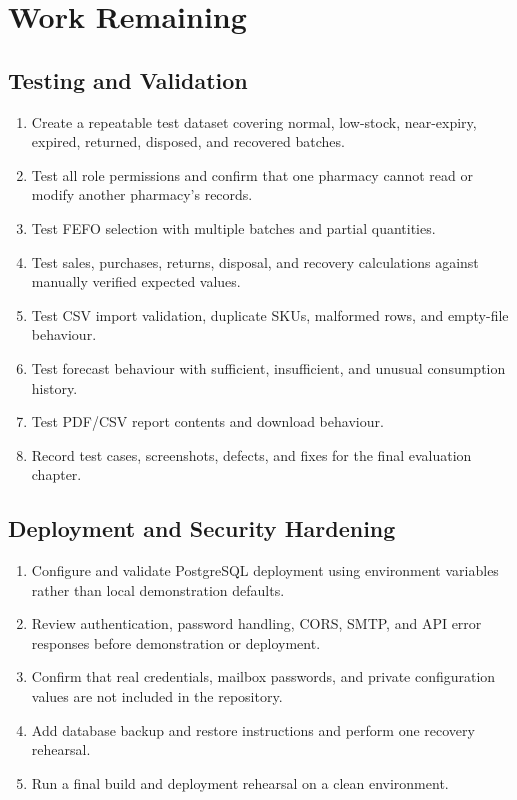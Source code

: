 \documentclass[12pt,a4paper]{article}
\begin{document}
\section{Work Remaining}
\subsection{Testing and Validation}
\begin{enumerate}[leftmargin=*]
    \item Create a repeatable test dataset covering normal, low-stock,
    near-expiry, expired, returned, disposed, and recovered batches.
    \item Test all role permissions and confirm that one pharmacy cannot read or
    modify another pharmacy's records.
    \item Test FEFO selection with multiple batches and partial quantities.
    \item Test sales, purchases, returns, disposal, and recovery calculations
    against manually verified expected values.
    \item Test CSV import validation, duplicate SKUs, malformed rows, and
    empty-file behaviour.
    \item Test forecast behaviour with sufficient, insufficient, and unusual
    consumption history.
    \item Test PDF/CSV report contents and download behaviour.
    \item Record test cases, screenshots, defects, and fixes for the final
    evaluation chapter.
\end{enumerate}

\subsection{Deployment and Security Hardening}
\begin{enumerate}[leftmargin=*]
    \item Configure and validate PostgreSQL deployment using environment
    variables rather than local demonstration defaults.
    \item Review authentication, password handling, CORS, SMTP, and API error
    responses before demonstration or deployment.
    \item Confirm that real credentials, mailbox passwords, and private
    configuration values are not included in the repository.
    \item Add database backup and restore instructions and perform one
    recovery rehearsal.
    \item Run a final build and deployment rehearsal on a clean environment.
\end{enumerate}
\end{document}
